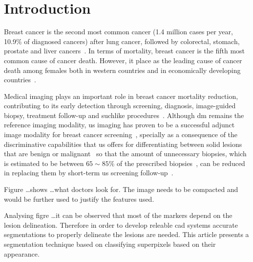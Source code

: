 \graphicspath{ {./content/intro/figures/} }

\section{Introduction}
\label{sec:intro}  %


Breast cancer is the second most common cancer (1.4 million cases per year, 10.9\% of  diagnosed cancers) after lung cancer, followed by colorectal, stomach, prostate and liver cancers~\cite{Ferlay2010}.
In terms of mortality, breast cancer is the fifth most common cause of cancer death.
However, it place as the leading cause of cancer death among females both in western countries and in economically developing countries~\cite{cancerStatistics2011}.

Medical imaging plays an important role in breast cancer mortality reduction, contributing to its early detection through screening, diagnosis, image-guided biopsy, treatment follow-up and suchlike procedures~\cite{smith2003american}.
Although \ac{dm} remains the reference imaging modality, \ac{us} imaging has proven to be a successful adjunct image modality for breast cancer screening~\cite{smith2003american,berg2004diagnostic}, specially as a consequence of the discriminative capabilities that \ac{us} offers for differentiating between solid lesions that are benign or malignant~\cite{Stavros:1995p12392} so that the amount of unnecessary biopsies, which is estimated to be between $65\sim85\%$ of the prescribed biopsies~\cite{yuan2010multimodality}, can be reduced~\cite{ciatto1994contribution} in replacing them by short-term \ac{us} screening follow-up~\cite{gordon1995malignant}.

Figure \dots shows \dots what doctors look for. The image needs to be compacted and would be further used to justify the features used.

Analysing figre \dots it can be observed that most of the markers depend on the lesion delineation.
Therefore in order to develop releable \ac{cad} systems accurate segmentations to properly delineate the lesions are needed. 
This article presents a segmentation technique based on classifying superpixels based on their appearance.

